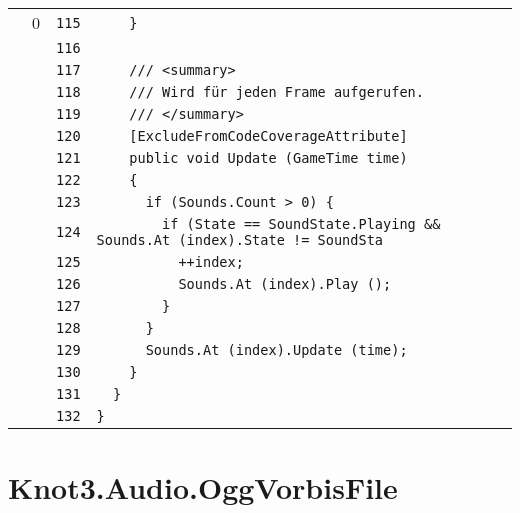 \documentclass[a4paper,10pt]{article}
\begin{document}
\begin{longtable}[l]{lrrl}
\cellcolor{red} & 0 & \verb~115~ & \verb~    }~\\
\cellcolor{gray} &  & \verb~116~ & \verb~~\\
\cellcolor{gray} &  & \verb~117~ & \verb~    /// <summary>~\\
\cellcolor{gray} &  & \verb~118~ & \verb~    /// Wird für jeden Frame aufgerufen.~\\
\cellcolor{gray} &  & \verb~119~ & \verb~    /// </summary>~\\
\cellcolor{gray} &  & \verb~120~ & \verb~    [ExcludeFromCodeCoverageAttribute]~\\
\cellcolor{gray} &  & \verb~121~ & \verb~    public void Update (GameTime time)~\\
\cellcolor{gray} &  & \verb~122~ & \verb~    {~\\
\cellcolor{gray} &  & \verb~123~ & \verb~      if (Sounds.Count > 0) {~\\
\cellcolor{gray} &  & \verb~124~ & \verb~        if (State == SoundState.Playing && Sounds.At (index).State != SoundSta~\\
\cellcolor{gray} &  & \verb~125~ & \verb~          ++index;~\\
\cellcolor{gray} &  & \verb~126~ & \verb~          Sounds.At (index).Play ();~\\
\cellcolor{gray} &  & \verb~127~ & \verb~        }~\\
\cellcolor{gray} &  & \verb~128~ & \verb~      }~\\
\cellcolor{gray} &  & \verb~129~ & \verb~      Sounds.At (index).Update (time);~\\
\cellcolor{gray} &  & \verb~130~ & \verb~    }~\\
\cellcolor{gray} &  & \verb~131~ & \verb~  }~\\
\cellcolor{gray} &  & \verb~132~ & \verb~}~\\
\end{longtable}
\newpage
\section{Knot3.Audio.OggVorbisFile}
\end{document}
